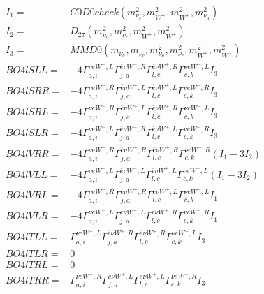 \documentclass[A4,landscape]{article}
\begin{document}
\begin{align} 
I_1 = & C0D0check(m^2_{\nu_{{c}}}, m^2_{W^+}, m^2_{W^+}, m^2_{\nu_{{a}}}) \\ 
I_2 = & D_{27}(m^2_{\nu_{{a}}}, m^2_{\nu_{{c}}}, m^2_{W^+}, m^2_{W^+}) \\ 
I_3 = & MMD0(m_{\nu_{{a}}}, m_{\nu_{{c}}}, m^2_{\nu_{{a}}}, m^2_{\nu_{{c}}}, m^2_{W^+}, m^2_{W^+}) \\ 
  BO4lSLL= & -4  \Gamma^{\nu e W^-,L}_{a, i} \Gamma^{\bar{e}\nu W^+ ,R}_{j, a} \Gamma^{\bar{e}\nu W^+ ,R}_{l, c} \Gamma^{\nu e W^-,L}_{c, k} I_3 \\ 
  BO4lSRR= & -4  \Gamma^{\nu e W^-,R}_{a, i} \Gamma^{\bar{e}\nu W^+ ,L}_{j, a} \Gamma^{\bar{e}\nu W^+ ,L}_{l, c} \Gamma^{\nu e W^-,R}_{c, k} I_3 \\ 
  BO4lSRL= & -4  \Gamma^{\nu e W^-,R}_{a, i} \Gamma^{\bar{e}\nu W^+ ,L}_{j, a} \Gamma^{\bar{e}\nu W^+ ,R}_{l, c} \Gamma^{\nu e W^-,L}_{c, k} I_3 \\ 
  BO4lSLR= & -4  \Gamma^{\nu e W^-,L}_{a, i} \Gamma^{\bar{e}\nu W^+ ,R}_{j, a} \Gamma^{\bar{e}\nu W^+ ,L}_{l, c} \Gamma^{\nu e W^-,R}_{c, k} I_3 \\ 
  BO4lVRR= & -4  \Gamma^{\nu e W^-,R}_{a, i} \Gamma^{\bar{e}\nu W^+ ,R}_{j, a} \Gamma^{\bar{e}\nu W^+ ,R}_{l, c} \Gamma^{\nu e W^-,R}_{c, k} (I_1 - 3 I_2) \\ 
  BO4lVLL= & -4  \Gamma^{\nu e W^-,L}_{a, i} \Gamma^{\bar{e}\nu W^+ ,L}_{j, a} \Gamma^{\bar{e}\nu W^+ ,L}_{l, c} \Gamma^{\nu e W^-,L}_{c, k} (I_1 - 3 I_2) \\ 
  BO4lVRL= & -4  \Gamma^{\nu e W^-,R}_{a, i} \Gamma^{\bar{e}\nu W^+ ,R}_{j, a} \Gamma^{\bar{e}\nu W^+ ,L}_{l, c} \Gamma^{\nu e W^-,L}_{c, k} I_1 \\ 
  BO4lVLR= & -4  \Gamma^{\nu e W^-,L}_{a, i} \Gamma^{\bar{e}\nu W^+ ,L}_{j, a} \Gamma^{\bar{e}\nu W^+ ,R}_{l, c} \Gamma^{\nu e W^-,R}_{c, k} I_1 \\ 
  BO4lTLL= &  \Gamma^{\nu e W^-,L}_{a, i} \Gamma^{\bar{e}\nu W^+ ,R}_{j, a} \Gamma^{\bar{e}\nu W^+ ,R}_{l, c} \Gamma^{\nu e W^-,L}_{c, k} I_3 \\ 
  BO4lTLR= & 0 \\ 
  BO4lTRL= & 0 \\ 
  BO4lTRR= &  \Gamma^{\nu e W^-,R}_{a, i} \Gamma^{\bar{e}\nu W^+ ,L}_{j, a} \Gamma^{\bar{e}\nu W^+ ,L}_{l, c} \Gamma^{\nu e W^-,R}_{c, k} I_3 \\ 
\end{align} 
\end{document}
